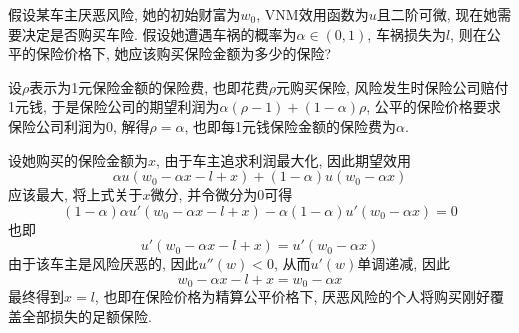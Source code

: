 \documentclass[cn, 12pt, math=mtpro2, bibstyle=apa, blue]{elegantbook}
\begin{document}
\begin{example}
假设某车主厌恶风险, 她的初始财富为$w_0$, VNM效用函数为$u$且二阶可微, 现在她需要决定是否购买车险. 假设她遭遇车祸的概率为$\alpha\in(0,1)$, 车祸损失为$l$, 则在公平的保险价格下, 她应该购买保险金额为多少的保险?

设$\rho$表示为1元保险金额的保险费, 也即花费$\rho$元购买保险, 风险发生时保险公司赔付1元钱, 于是保险公司的期望利润为$\alpha(\rho-1)+(1-\alpha)\rho$, 公平的保险价格要求保险公司利润为0, 解得$\rho=\alpha$, 也即每1元钱保险金额的保险费为$\alpha$.

设她购买的保险金额为$x$, 由于车主追求利润最大化, 因此期望效用
$$\alpha u(w_0-\alpha x-l+x)+(1-\alpha)u(w_0-\alpha x)$$
应该最大, 将上式关于$x$微分, 并令微分为0可得
$$(1-\alpha)\alpha u'(w_0-\alpha x-l+x)-\alpha(1-\alpha)u'(w_0-\alpha x)=0$$
也即
$$u'(w_0-\alpha x-l+x)=u'(w_0-\alpha x)$$
由于该车主是风险厌恶的, 因此$u''(w)<0$, 从而$u'(w)$单调递减, 因此
$$w_0-\alpha x-l+x=w_0-\alpha x$$
最终得到$x=l$, 也即在保险价格为精算公平价格下, 厌恶风险的个人将购买刚好覆盖全部损失的足额保险.
\end{example}
\end{document}
